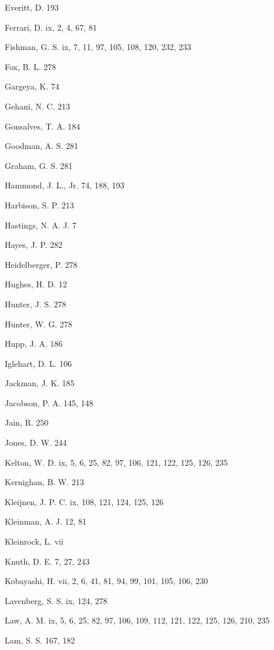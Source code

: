 \noindent Everitt, D. 193\par
\noindent Ferrari, D. ix, 2, 4, 67, 81\par
\noindent Fishman, G. S. ix, 7, 11, 97, 105, 108, 120, 232, 233\par
\noindent Fox, B. L. 278\par
\noindent Gargeya, K. 74\par
\noindent Gehani, N. C. 213\par
\noindent Gonsalves, T. A. 184\par
\noindent Goodman, A. S. 281\par
\noindent Graham, G. S. 281\par
\noindent Hammond, J. L., Jr. 74, 188, 193\par
\noindent Harbison, S. P. 213\par
\noindent Hastings, N. A. J. 7\par
\noindent Hayes, J. P. 282\par
\noindent Heidelberger, P. 278\par
\noindent Hughes, H. D. 12\par
\noindent Hunter, J. S. 278\par
\noindent Hunter, W. G. 278\par
\noindent Hupp, J. A. 186\par
\noindent Iglehart, D. L. 106\par
\noindent Jackman, J. K. 185\par
\noindent Jacobson, P. A. 145, 148\par
\noindent Jain, R. 250\par
\noindent Jones, D. W. 244\par
\noindent Kelton, W. D. ix, 5, 6, 25, 82, 97, 106, 121, 122, 125, 126, 235\par
\noindent Kernighan, B. W. 213\par
\noindent Kleijnen, J. P. C. ix, 108, 121, 124, 125, 126\par
\noindent Kleinman, A. J. 12, 81\par
\noindent Kleinrock, L. vii\par
\noindent Knuth, D. E. 7, 27, 243\par
\noindent Kobayashi, H. vii, 2, 6, 41, 81, 94, 99, 101, 105, 106, 230\par
\noindent Lavenberg, S. S. ix, 124, 278\par
\noindent Law, A. M. ix, 5, 6, 25, 82, 97, 106, 109, 112, 121, 122, 125, 126, 210, 235\par
\noindent Lam, S. S. 167, 182\par
